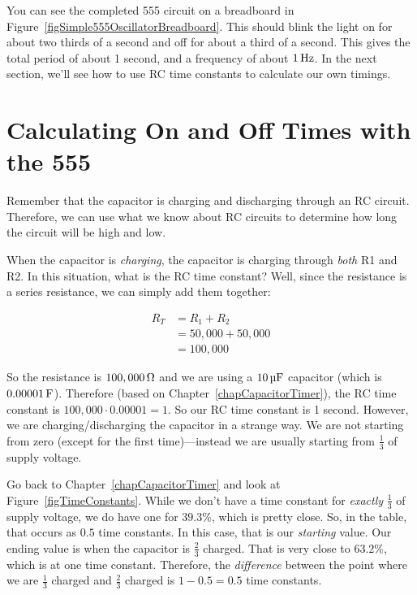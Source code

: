 
You can see the completed 555 circuit on a breadboard in Figure~\ref{figSimple555OscillatorBreadboard}.
This should blink the light on for about two thirds of a second and off for about a third of a second.
This gives the total period of about 1 second, and a frequency of about $1\,\si{\hertz}$.
In the next section, we'll see how to use RC time constants to calculate our own timings.

\section{Calculating On and Off Times with the 555}

Remember that the capacitor is charging and discharging through an RC circuit.
Therefore, we can use what we know about RC circuits to determine how long the circuit will be high and low.

When the capacitor is \emph{charging}, the capacitor is charging through \emph{both} R1 and R2.
In this situation, what is the RC time constant?
Well, since the resistance is a series resistance, we can simply add them together:

\begin{align*}
R_T &= R_1 + R_2 \\
    &= 50,000 + 50,000 \\
    &= 100,000
\end{align*}

So the resistance is $100,000\,\si{\ohm}$ and we are using a $10\,\si{\micro\farad}$ capacitor (which is $0.00001\,\si{\farad}$).
Therefore (based on Chapter~\ref{chapCapacitorTimer}), the RC time constant is $100,000 \cdot 0.00001 = 1$.
So our RC time constant is 1 second.
However, we are charging/discharging the capacitor in a strange way.
We are not starting from zero (except for the first time)---instead we are usually starting from $\frac{1}{3}$ of supply voltage.

Go back to Chapter~\ref{chapCapacitorTimer} and look at Figure~\ref{figTimeConstants}.
While we don't have a time constant for \emph{exactly} $\frac{1}{3}$ of supply voltage, we do have one for $39.3\%$, which is pretty close.
So, in the table, that occurs as $0.5$ time constants.
In this case, that is our \emph{starting} value.
Our ending value is when the capacitor is $\frac{2}{3}$ charged.
That is very close to $63.2\%$, which is at one time constant.
Therefore, the \emph{difference} between the point where we are $\frac{1}{3}$ charged and $\frac{2}{3}$ charged is $1 - 0.5 = 0.5$ time constants.

